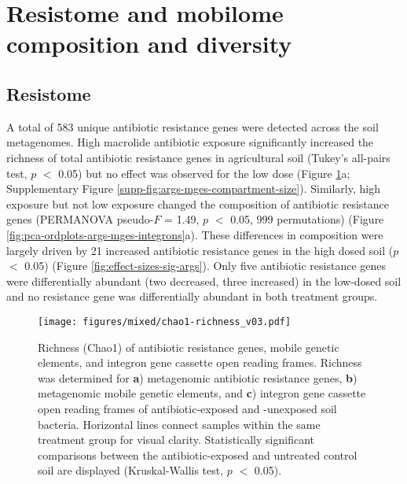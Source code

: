 \section{Resistome and mobilome composition and diversity}

\subsection{Resistome}

A total of 583 unique antibiotic resistance genes were detected across the soil metagenomes.
High macrolide antibiotic exposure significantly increased the richness of total antibiotic resistance genes in agricultural soil (Tukey’s all-pairs test, $p$ $<$ 0.05) but no effect was observed for the low dose (Figure \ref{fig:chao1-richness}a; Supplementary Figure \ref{supp-fig:args-mges-compartment-size}).
Similarly, high exposure but not low exposure changed the composition of antibiotic resistance genes (PERMANOVA pseudo-$F$ = 1.49, $p$ $<$ 0.05, 999 permutations) (Figure \ref{fig:pca-ordplots-args-mges-integrons}a).
These differences in composition were largely driven by 21 increased antibiotic resistance genes in the high dosed soil ($p$ $<$ 0.05) (Figure \ref{fig:effect-sizes-sig-args}).
Only five antibiotic resistance genes were differentially abundant (two decreased, three increased) in the low-dosed soil and no resistance gene was differentially abundant in both treatment groups.

\begin{figure}[htpb]
	\centering
		\texttt{[image: figures/mixed/chao1-richness\_v03.pdf]}
	\caption[Richness (Chao1) of antibiotic resistance genes, mobile genetic elements, and integron gene cassette open reading frames.]{
		Richness (Chao1) of antibiotic resistance genes, mobile genetic elements, and integron gene cassette open reading frames.
		Richness was determined for \textbf{a}) metagenomic antibiotic resistance genes, \textbf{b}) metagenomic mobile genetic elements, and \textbf{c}) integron gene cassette open reading frames of antibiotic-exposed and -unexposed soil bacteria.
		Horizontal lines connect samples within the same treatment group for visual clarity.
		Statistically significant comparisons between the antibiotic-exposed and untreated control soil are displayed (Kruskal-Wallis test, $p$ $<$ 0.05).
	}
	\label{fig:chao1-richness}
\end{figure}

